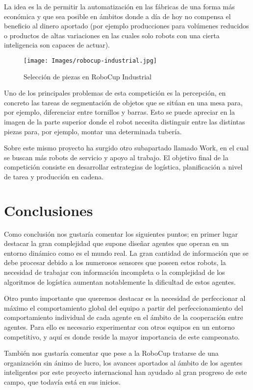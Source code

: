 \documentclass[11pt,oneside,a4paper]{book}
\begin{document}
La idea es la de permitir la automatización en las fábricas de una forma más económica y que sea posible en ámbitos donde a día de hoy no compensa el beneficio al dinero aportado (por ejemplo producciones para volúmenes reducidos o productos de altas variaciones en las cuales solo robots con una cierta inteligencia son capaces de actuar).
\begin{figure}[H]
\begin{center}
\texttt{[image: Images/robocup-industrial.jpg]}
\caption{Selección de piezas en  RoboCup Industrial}
\end{center}
\end{figure}

Uno de los principales problemas de esta competición es la percepción, en concreto las tareas de segmentación de objetos que se sitúan en una mesa para, por ejemplo, diferenciar entre tornillos y barras. Esto se puede apreciar en la imagen de la parte superior donde el robot necesita distinguir entre las distintas piezas para, por ejemplo, montar una determinada tubería.

Sobre este mismo proyecto ha surgido otro subapartado llamado Work, en el cual se buscan más robots de servicio y apoyo al trabajo. El objetivo final de la competición consiste en desarrollar estrategias de logística, planificación a nivel de tarea y producción en cadena. 
\chapter{Conclusiones}
Como conclusión nos gustaría comentar los siguientes puntos; en primer lugar destacar la gran complejidad que supone diseñar agentes que operan en un entorno dinámico como es el mundo real. La gran cantidad de información que se debe procesar debido a los numerosos sensores que poseen estos robots, la necesidad de trabajar con información incompleta o la complejidad de los algoritmos de logística aumentan notablemente la dificultad de estos agentes.

Otro punto importante que queremos destacar es la necesidad de perfeccionar al máximo el comportamiento global del equipo a partir del perfeccionamiento del comportamiento individual de cada agente en el ámbito de la cooperación entre agentes. Para ello es necesario experimentar con otros equipos en un entorno competitivo, y aquí es donde reside la mayor importancia de este campeonato.

También nos gustaría comentar que pese a la RoboCup tratarse de una organización sin ánimo de lucro, los avances aportados al ámbito de los agentes inteligentes por este proyecto internacional han ayudado al gran progreso de este campo, que todavía está en sus inicios.
\end{document}
